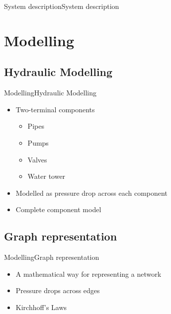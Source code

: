 \begin{frame}{System description}{System description}
\begin{figure}[H]
\centering
\resizebox{1\linewidth}{!}{}
\end{figure}

\end{frame}


\section{Modelling}
\subsection{Hydraulic Modelling}

\begin{frame}{Modelling}{Hydraulic Modelling}
\begin{itemize}
	\item<1-> Two-terminal components 
	\begin{itemize}
		\item<1-> Pipes 
		\item<1-> Pumps
		\item<1-> Valves
		\item<1-> Water tower
	\end{itemize}
	\item<1-> Modelled as pressure drop across each component
\end{itemize}

	\begin{itemize}
		\item<2-> Complete component model
	\end{itemize}

\end{frame}

\subsection{Graph representation}


\begin{frame}{Modelling}{Graph representation}
\begin{itemize}
	\item<1-> A mathematical way for representing a network
	\item<1-> Pressure drops across edges
	\item<1-> Kirchhoff's Laws 
\end{itemize}
\vspace{-0.5cm}

\end{frame}


